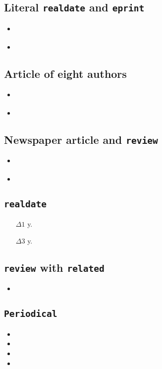 \documentclass[a4paper,12pt]{scrartcl}
\newcommand*{\Typ}[1]{\texttt{\symbol{64}#1}}
\newcommand*{\Feld}[1]{\texttt{#1}}
\begin{document}
\subsection{Literal \Feld{realdate} and \Feld{eprint}}
\begin{itemize}
    \item\cite{lindauer:oj}%
    \item{}%
\end{itemize}

\subsection{Article of eight authors}
\begin{itemize}
    \item\cite{summerhayes:et:al:1993}%
    \item{}%
\end{itemize}

\subsection{Newspaper article and \Typ{review}}
\begin{itemize}
    \item\cite{stafford:2004}%
    \item{}%
\end{itemize}

\subsection{\Feld{realdate}}
\begin{itemize}
    \item[$\Delta 1$ y.]%
    \item[$\Delta 3$ y.]%
\end{itemize}

\subsection{\Typ{review} with \Feld{related}}
\begin{itemize}
    \item{}%
\end{itemize}

\subsection{\Typ{Periodical}}
\begin{itemize}
	\item{}%
    \item{}%
	\item{}%
	\item{}%
\end{itemize}

\printbibliography

\end{document}

